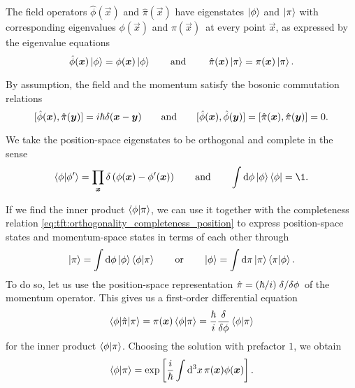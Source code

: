 The field operators $\hat{\phi}(\vec{x})$ and $\hat{\pi}(\vec{x})$ have eigenstates $\ket{\phi}$ and $\ket{\pi}$ with corresponding eigenvalues $\phi(\vec{x})$ and $\pi(\vec{x})$ at every point $\vec{x}$, as expressed by the eigenvalue equations
\begin{equation}
	\hat{\phi}(\vec{x}) \ket{\phi} = \phi(\vec{x}) \ket{\phi}
	\qquad \text{and} \qquad
	\hat{\pi}(\vec{x}) \ket{\pi} = \pi(\vec{x}) \ket{\pi} .
\label{eq:tft:field_eigenvalue_equations}
\end{equation}

By assumption, the field and the momentum satisfy the bosonic commutation relations
\begin{equation}
	[ \hat{\phi}({\bm{x}}) , \hat{\pi}({\bm{y}}) ] = i \hbar \delta({\bm{x}} - {\bm{y}})
	\qquad \text{and} \qquad
	[ \hat{\phi}({\bm{x}}) , \hat{\phi}({\bm{y}}) ] = 
	[ \hat{\pi}({\bm{x}}) , \hat{\pi}({\bm{y}}) ] = 
	0 .
\label{eq:tft:boson_field_commutators}
\end{equation}

We take the position-space eigenstates to be orthogonal and complete in the sense
\begin{equation}
	\braket{\phi | \phi'} = \prod_{\vec{x}} \delta \left( \phi(\vec{x}) - \phi'(\vec{x}) \right)
	\qquad \text{and} \qquad
	\int \dif \phi \ket{\phi} \bra{\phi} = \1 .
	\label{eq:tft:orthogonality_completeness_position}
\end{equation}

\newcommand{\posmom}[2]{\exp \left[  \frac{i}{\hbar} \int \dif^3 x \, #2(\vec{x}) #1(\vec{x}) \right]}
\newcommand{\mompos}[2]{\exp \left( -\frac{i}{\hbar} \int \dif^3 x \, #1(\vec{x}) #2(\vec{x}) \right)}
If we find the inner product $\braket{\phi | \pi}$, we can use it together with the completeness relation \eqref{eq:tft:orthogonality_completeness_position} to express position-space states and momentum-space states in terms of each other through
\begin{equation}
	\ket\pi = \int \dif \phi \ket\phi \braket{\phi | \pi} %
	\qquad \text{or} \qquad
	\ket\phi = \int \dif \pi \ket\pi \braket{\pi | \phi} . %
\end{equation}
To do so, let us use the position-space representation $\hat{\pi} = (\hbar / i) \fdv{}/{\phi}$ of the momentum operator.
This gives us a first-order differential equation
\begin{equation}
	\braket{\phi | \hat{\pi} | \pi} = \pi(\vec{x}) \braket{\phi | \pi} = \frac{\hbar}{i} \fdv*{\braket{\phi | \pi}}{\phi}
\end{equation}
for the inner product $\braket{\phi | \pi}$.
Choosing the solution with prefactor $1$, we obtain
\begin{equation}
	\braket{\phi | \pi} = \posmom{\phi}{\pi} .
	\label{eq:tft:inner_product_position_momentum}
\end{equation}


